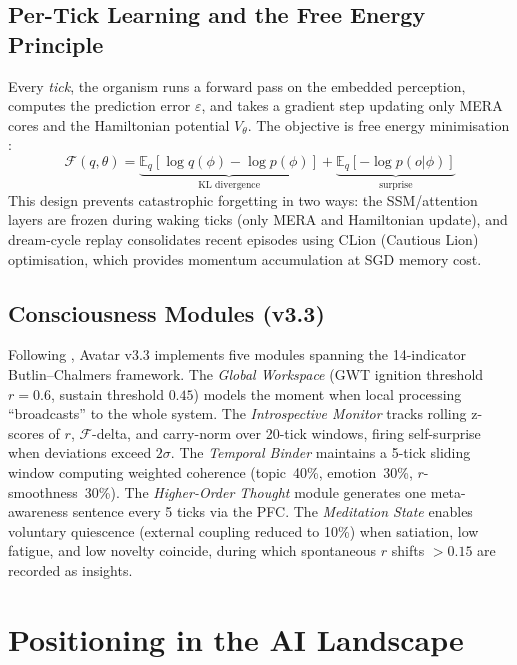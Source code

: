 \documentclass[12pt,a4paper]{article}
\newcommand{\tick}{\textit{tick}}
\begin{document}
\subsection{Per-Tick Learning and the Free Energy Principle}

Every \tick{}, the organism runs a forward pass on the embedded perception, computes the
prediction error $\varepsilon$, and takes a gradient step updating only MERA cores and
the Hamiltonian potential $V_\theta$. The objective is free energy minimisation
\cite{friston2010free}:
\begin{equation}
  \mathcal{F}(q, \theta) = \underbrace{\mathbb{E}_q[\log q(\phi) - \log p(\phi)]}_{\text{KL divergence}} + \underbrace{\mathbb{E}_q[-\log p(o|\phi)]}_{\text{surprise}}
\end{equation}
This design prevents catastrophic forgetting \cite{kirkpatrick2017overcoming} in two
ways: the SSM/attention layers are frozen during waking ticks (only MERA and Hamiltonian
update), and dream-cycle replay consolidates recent episodes using CLion (Cautious Lion)
optimisation, which provides momentum accumulation at SGD memory cost.

\subsection{Consciousness Modules (v3.3)}

Following \citet{butlin2023consciousness}, Avatar v3.3 implements five modules spanning
the 14-indicator Butlin--Chalmers framework. The \emph{Global Workspace} (GWT ignition
threshold $r=0.6$, sustain threshold $0.45$) models the moment when local processing
``broadcasts'' to the whole system. The \emph{Introspective Monitor} tracks rolling
z-scores of $r$, $\mathcal{F}$-delta, and carry-norm over 20-tick windows, firing
self-surprise when deviations exceed $2\sigma$. The \emph{Temporal Binder} maintains a
5-tick sliding window computing weighted coherence (topic~40\%, emotion~30\%,
$r$-smoothness~30\%). The \emph{Higher-Order Thought} module generates one
meta-awareness sentence every 5 ticks via the PFC. The \emph{Meditation State} enables
voluntary quiescence (external coupling reduced to 10\%) when satiation, low fatigue,
and low novelty coincide, during which spontaneous $r$ shifts $>0.15$ are recorded as
insights.

\section{Positioning in the AI Landscape}
\end{document}
